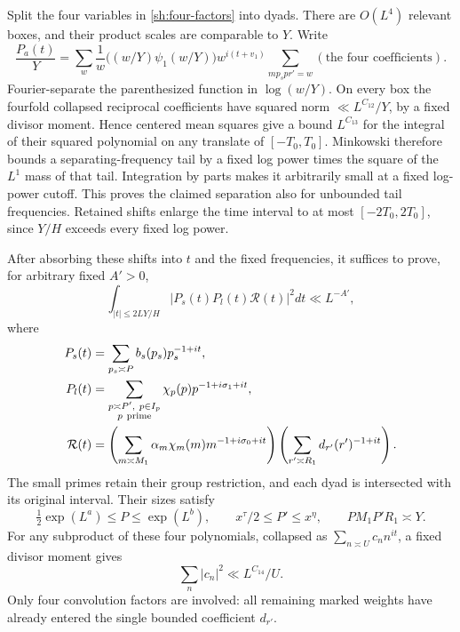 Split the four variables in \eqref{sh:four-factors} into dyads.
There are $O(L^4)$ relevant boxes, and their product scales are
comparable to $Y$.  Write
\[
 \frac{P_a(t)}Y
 =\sum_w\frac1w\big((w/Y)\psi_1(w/Y)\big)w^{i(t+v_1)}
        \sum_{mp_sp r'=w}(\text{the four coefficients}).
\]
Fourier-separate the parenthesized function in $\log(w/Y)$.  On
every box the fourfold collapsed reciprocal coefficients have
squared norm $\ll L^{C_{12}}/Y$, by a fixed divisor moment.
Hence centered mean squares give a bound $L^{C_{13}}$ for the
integral of their squared polynomial on any translate of
$[-T_0,T_0]$.  Minkowski therefore bounds a separating-frequency
tail by a fixed log power times the square of the $L^1$ mass of
that tail.  Integration by parts makes it arbitrarily small at a
fixed log-power cutoff.  This proves the claimed separation also
for unbounded tail frequencies.  Retained shifts enlarge the
time interval to at most $[-2T_0,2T_0]$, since $Y/H$ exceeds every
fixed log power.

After absorbing these shifts into $t$ and the fixed frequencies,
it suffices to prove, for arbitrary fixed $A'>0$,
\begin{equation}\label{sh:polynomial-target}
 \int_{|t|\leq2LY/H}|P_s(t)P_l(t)\mathcal R(t)|^2dt
 \ll L^{-A'},
\end{equation}
where
\begin{align*}
 P_s(t)&=\sum_{p_s\asymp P}b_s(p_s)p_s^{-1+it},\\
 P_l(t)&=\sum_{\substack{p\asymp P',\ p\in I_p\\p\ {\rm prime}}}
                      \chi_p(p)p^{-1+i\sigma_1+it},\\
 \mathcal R(t)&=
  \left(\sum_{m\asymp M_1}\alpha_m\chi_m(m)m^{-1+i\sigma_0+it}\right)
  \left(\sum_{r'\asymp R_1}d_{r'}(r')^{-1+it}\right).
\end{align*}
The small primes retain their group restriction, and each dyad is
intersected with its original interval.  Their sizes satisfy
\begin{equation}\label{sh:polynomial-scales}
 \tfrac12\exp(L^a)\leq P\leq\exp(L^b),\qquad
 x^\tau/2\leq P'\leq x^\eta,\qquad PM_1P'R_1\asymp Y.
\end{equation}
For any subproduct of these four polynomials, collapsed as
$\sum_{n\asymp U}c_nn^{it}$, a fixed divisor moment gives
\begin{equation}\label{sh:collapsed-norm}
 \sum_n|c_n|^2\ll L^{C_{14}}/U.
\end{equation}
Only four convolution factors are involved: all remaining marked
weights have already entered the single bounded coefficient $d_{r'}$.

